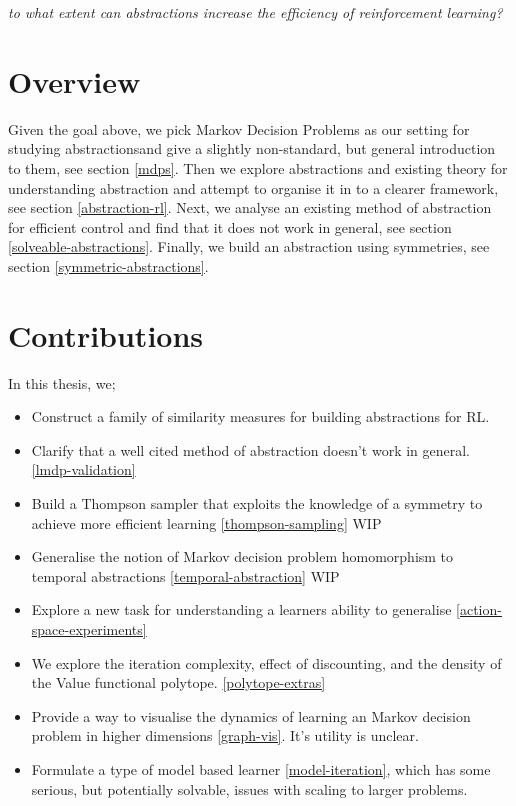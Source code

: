 \begin{displayquote}
\textit{to what extent can abstractions increase the efficiency of reinforcement learning?}
\end{displayquote}

\section{Overview}

Given the goal above, we pick Markov Decision Problems as our setting for studying abstractions\footnotemark[43] and give a slightly non-standard, but general introduction to them, see section \ref{mdps}.
Then we explore abstractions and existing theory for understanding abstraction and attempt to organise it in to a clearer framework, see section \ref{abstraction-rl}.
Next, we analyse an existing method of abstraction for efficient control and find that it does not work in general, see section \ref{solveable-abstractions}.
Finally, we build an abstraction using symmetries, see section \ref{symmetric-abstractions}.


\section{Contributions}

In this thesis, we;

\begin{itemize}
  \tightlist
  \item Construct a family of similarity measures for building abstractions for RL.
  \item Clarify that a well cited method of abstraction doesn't work in general. \ref{lmdp-validation}
  \item Build a Thompson sampler that exploits the knowledge of a symmetry to achieve more efficient learning \ref{thompson-sampling} {\color{red}WIP}
  \item Generalise the notion of Markov decision problem homomorphism to temporal abstractions \ref{temporal-abstraction} {\color{red}WIP}
  \item Explore a new task for understanding a learners ability to generalise \ref{action-space-experiments}
  \item We explore the iteration complexity, effect of discounting, and the density of the Value functional polytope. \ref{polytope-extras}
  \item Provide a way to visualise the dynamics of learning an Markov decision problem in higher dimensions \ref{graph-vis}. It's utility is unclear.
  \item Formulate a type of model based learner \ref{model-iteration}, which has some serious, but potentially solvable, issues with scaling to larger problems.
\end{itemize}
